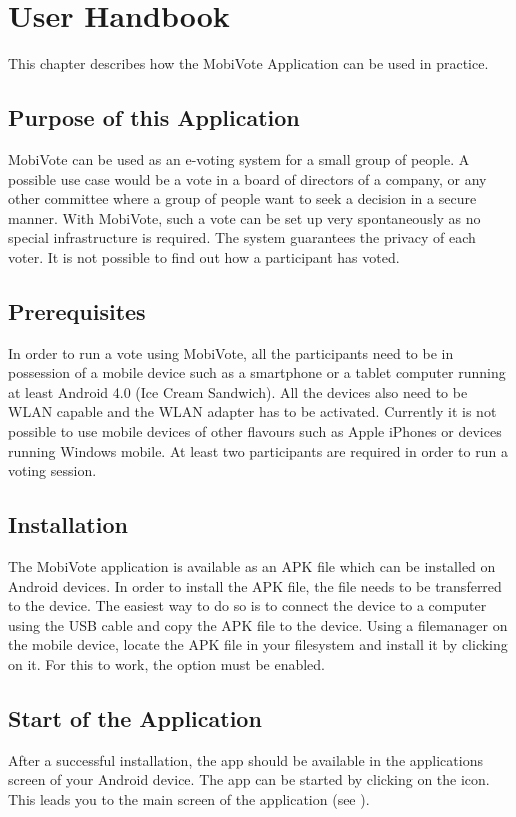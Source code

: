 \documentclass[numbers=noenddot, abstract=on, a4paper, headsepline,
footsepline, oneside, openright, draft=off, listof=leveldown]{scrreprt}
\newcommand{\myref}[1]{(see \Vref{#1})}
\begin{document}
\printbibliography

\appendix

\chapter{User Handbook}
\label{cha:handbook}
This chapter describes how the MobiVote Application can be used in practice.

\section{Purpose of this Application}
MobiVote can be used as an e-voting system for a small group of people. A
possible use case would be a vote in a board of directors of a company, or any
other committee where a group of people want to seek a decision in a secure
manner. With MobiVote, such a vote can be set up very spontaneously as no
special infrastructure is required. The system guarantees the privacy of each
voter. It is not possible to find out how a participant has voted.

\section{Prerequisites}
In order to run a vote using MobiVote, all the participants need to be in
possession of a mobile device such as a smartphone or a tablet computer running
at least Android 4.0 (Ice Cream Sandwich). All the devices also need to be WLAN
capable and the WLAN adapter has to be activated. Currently it is not possible
to use mobile devices of other flavours such as Apple iPhones or devices running
Windows mobile. At least two participants are required in order to run a voting
session.

\section{Installation}
The MobiVote application is available as an APK file which can be installed on
Android devices. In order to install the APK file, the file needs to be
transferred to the device. The easiest way to do so is to connect the device to
a computer using the USB cable and copy the APK file to the device. Using a filemanager on
the mobile device, locate the APK file in your filesystem and install it by
clicking on it. For this to work, the option  must be enabled.

\section{Start of the Application}
After a successful installation, the app should be available in the applications
screen of your Android device. The app can be started by clicking on the icon.
This leads you to the main screen of the application
\myref{fig:handbook_mainscreen}.
\end{document}
